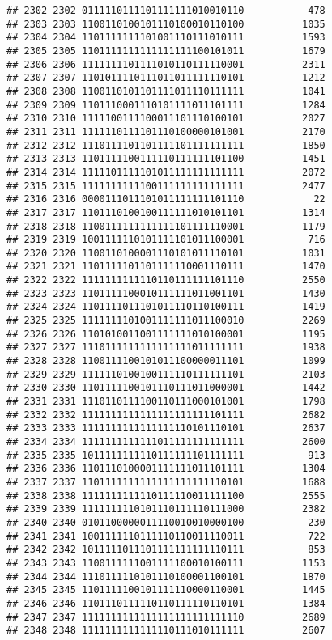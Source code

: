 \documentclass[]{article}
\begin{document}
\begin{verbatim}
## 2302 2302 0111110111101111111010010110           478
## 2303 2303 1100110100101110100010110100          1035
## 2304 2304 1101111111101001110111010111          1593
## 2305 2305 1101111111111111111100101011          1679
## 2306 2306 1111111101111010110111110001          2311
## 2307 2307 1101011110111011011111110101          1212
## 2308 2308 1100110101101111011110111111          1041
## 2309 2309 1101110001110101111011101111          1284
## 2310 2310 1111100111100011101110100101          2027
## 2311 2311 1111110111101110100000101001          2170
## 2312 2312 1110111101101111101111111111          1850
## 2313 2313 1101111100111110111111101100          1451
## 2314 2314 1111101111101011111111111111          2072
## 2315 2315 1111111111100111111111111111          2477
## 2316 2316 0000111011101011111111101110            22
## 2317 2317 1101110100100111111010101101          1314
## 2318 2318 1100111111111111101111110001          1179
## 2319 2319 1001111110101111101011100001           716
## 2320 2320 1100110100001110101011110101          1031
## 2321 2321 1101111101101111110001110111          1470
## 2322 2322 1111111111110110111111101110          2550
## 2323 2323 1101111100010111111011001101          1430
## 2324 2324 1101111011101011110110100111          1419
## 2325 2325 1111111101001111111011100010          2269
## 2326 2326 1101010011001111111010100001          1195
## 2327 2327 1110111111111111111011111111          1938
## 2328 2328 1100111100101011100000011101          1099
## 2329 2329 1111110100100111110111111101          2103
## 2330 2330 1101111100101110111011000001          1442
## 2331 2331 1110110111100110111000101001          1798
## 2332 2332 1111111111111111111111101111          2682
## 2333 2333 1111111111111111110101110101          2637
## 2334 2334 1111111111111011111111111111          2600
## 2335 2335 1011111111110111111101111111           913
## 2336 2336 1101110100001111111011101111          1304
## 2337 2337 1101111111111111111111110101          1688
## 2338 2338 1111111111110111110011111100          2555
## 2339 2339 1111111110101110111110111000          2382
## 2340 2340 0101100000011110010010000100           230
## 2341 2341 1001111110111110110011110011           722
## 2342 2342 1011111011101111111111110111           853
## 2343 2343 1100111111001111100010100111          1153
## 2344 2344 1110111110101110100001100101          1870
## 2345 2345 1101111100101111110000110001          1445
## 2346 2346 1101110111110110111110110101          1384
## 2347 2347 1111111111111111111111111110          2689
## 2348 2348 1111111111111110111010111111          2607

\end{verbatim}
\end{document}
